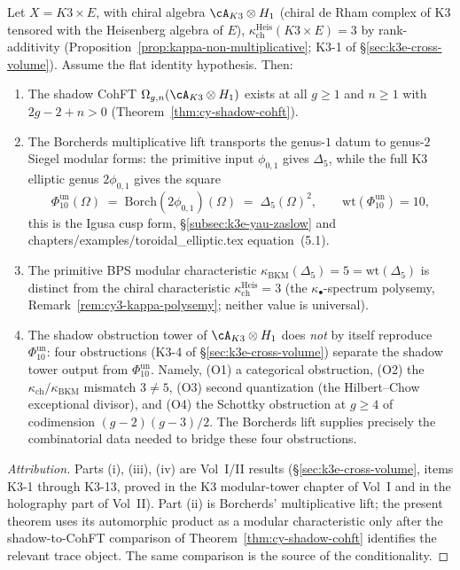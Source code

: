 \begin{theorem}
\label{thm:k3xe-shadow-cohft-igusa}
Let $X = K3 \times E$, with chiral algebra $\cA_{K3} \otimes H_1$ (chiral de Rham complex of K3 tensored with the Heisenberg algebra of $E$), $\kappa_{\mathrm{ch}}^{\mathrm{Heis}}(K3 \times E) = 3$ by rank-additivity (Proposition~\ref{prop:kappa-non-multiplicative}; K3-1 of \S\ref{sec:k3e-cross-volume}). Assume the flat identity hypothesis. Then:
\begin{enumerate}[label=(\roman*)]
 \item The shadow CohFT $\Omega_{g,n}(\cA_{K3} \otimes H_1)$ exists at all $g \geq 1$ and $n \geq 1$ with $2g - 2 + n > 0$ (Theorem~\ref{thm:cy-shadow-cohft}).
 \item The Borcherds multiplicative lift transports the genus-$1$ datum
 to genus-$2$ Siegel modular forms: the primitive input $\phi_{0,1}$
 gives $\Delta_5$, while the full K3 elliptic genus $2\phi_{0,1}$
 gives the square
 \[
 \Phi_{10}^{\mathrm{un}}(\Omega)
 \;=\; \mathrm{Borch}(2\phi_{0,1})(\Omega)
 \;=\; \Delta_5(\Omega)^2,
 \qquad \mathrm{wt}(\Phi_{10}^{\mathrm{un}}) = 10,
\]
 this is the Igusa cusp form, \S\ref{subsec:k3e-yau-zaslow} and chapters/examples/toroidal\_elliptic.tex equation~(5.1).
 \item The primitive BPS modular characteristic
 $\kappa_{\mathrm{BKM}}(\Delta_5) = 5 =
 \mathrm{wt}(\Delta_5)$ is distinct from the chiral characteristic
 $\kappa_{\mathrm{ch}}^{\mathrm{Heis}} = 3$ (the
 $\kappa_\bullet$-spectrum polysemy, Remark~\ref{rem:cy3-kappa-polysemy};
 neither value is universal).
 \item The shadow obstruction tower of $\cA_{K3} \otimes H_1$ does \emph{not} by itself reproduce $\Phi_{10}^{\mathrm{un}}$: four obstructions (K3-4 of \S\ref{sec:k3e-cross-volume}) separate the shadow tower output from $\Phi_{10}^{\mathrm{un}}$. Namely, (O1) a categorical obstruction, (O2) the $\kappa_{\mathrm{ch}}/\kappa_{\mathrm{BKM}}$ mismatch $3 \neq 5$, (O3) second quantization (the Hilbert--Chow exceptional divisor), and (O4) the Schottky obstruction at $g \geq 4$ of codimension $(g-2)(g-3)/2$. The Borcherds lift supplies precisely the combinatorial data needed to bridge these four obstructions.
\end{enumerate}
\end{theorem}

\begin{proof}[Attribution]
Parts (i), (iii), (iv) are Vol~I/II results (\S\ref{sec:k3e-cross-volume}, items K3-1 through K3-13, proved in the K3 modular-tower chapter of Vol~I and in the holography part of Vol~II). Part (ii) is Borcherds' multiplicative lift; the present theorem uses its automorphic product as a modular characteristic only after the shadow-to-CohFT comparison of Theorem~\ref{thm:cy-shadow-cohft} identifies the relevant trace object. The same comparison is the source of the conditionality.
\end{proof}

